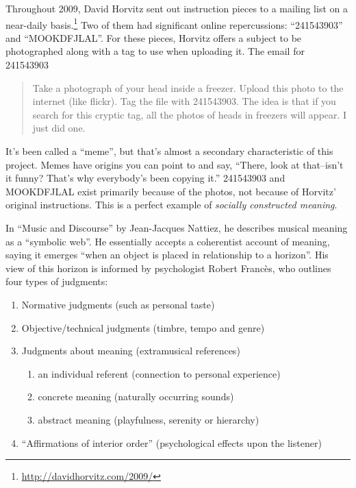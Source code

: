 \documentclass{thesis}
\begin{document}
	Throughout 2009, David Horvitz sent out instruction pieces to a mailing list on a near-daily basis.\footnote{\url{http://davidhorvitz.com/2009/}} Two of them had significant online repercussions: ``241543903''\cite{david_horvitz_flickr:_????-1} and ``MOOKDFJLAL''\cite{david_horvitz_flickr:_????}. For these pieces, Horvitz offers a subject to be photographed along with a tag to use when uploading it. The email for 241543903
	
	\begin{quote}
	Take a photograph of your head inside a freezer. Upload this photo to the internet (like flickr). Tag the file with 241543903. The idea is that if you search for this cryptic tag, all the photos of heads in freezers will appear. I just did one.
	\end{quote}
	
	It's been called a ``meme'', but that's almost a secondary characteristic of this project. Memes have origins you can point to and say, ``There, look at that--isn't it funny? That's why everybody's been copying it.'' 241543903 and MOOKDFJLAL exist primarily because of the photos, not because of Horvitz' original instructions. This is a perfect example of \emph{socially constructed meaning}.
			
	In ``Music and Discourse'' by Jean-Jacques Nattiez\cite{nattiez_music_1990}, he describes musical meaning as a ``symbolic web''. He essentially accepts a coherentist account of meaning, saying it emerges ``when an object is placed in relationship to a horizon''. His view of this horizon is informed by psychologist Robert Franc\`es, who outlines four types of judgments:
	
\begin{enumerate}
	\item Normative judgments (such as personal taste)
	\item Objective/technical judgments (timbre, tempo and genre)
	\item Judgments about meaning (extramusical references)
		\begin{enumerate}
			\item an individual referent (connection to personal experience)
			\item concrete meaning (naturally occurring sounds)
			\item abstract meaning (playfulness, serenity or hierarchy)
		\end{enumerate}
	\item ``Affirmations of interior order'' (psychological effects upon the listener)
\end{enumerate}
\end{document}
